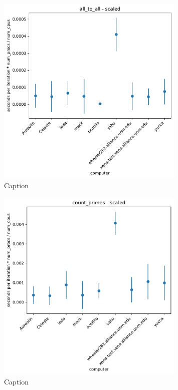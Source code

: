 \documentclass{article}
\begin{document}
\begin{figure}[h]
    \centering
    \includegraphics[width=0.8\textwidth]{figures/final/all_to_all_scaled.pdf}
    \caption{Caption}
    \label{fig:all_to_all_scaled}
\end{figure}

\begin{figure}[h]
    \centering
    \includegraphics[width=0.8\textwidth]{figures/final/count_primes_scaled.pdf}
    \caption{Caption}
    \label{fig:count_primes_scaled}
\end{figure}
\end{document}

